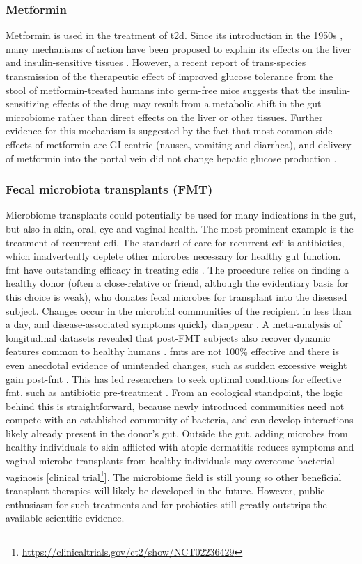 \subsubsection{Metformin}
Metformin is used in the treatment of \gls{t2d}. Since its introduction in the 1950s \cite{RN4103}, many mechanisms of action have been proposed to explain its effects on the liver and insulin-sensitive tissues \cite{RN4126}. However, a recent report of trans-species transmission of the therapeutic effect of improved glucose tolerance from the stool of metformin-treated humans into germ-free mice \cite{RN4127} suggests that the insulin-sensitizing effects of the drug may result from a metabolic shift in the gut microbiome rather than direct effects on the liver or other tissues. Further evidence for this mechanism is suggested by the fact that most common side-effects of metformin are GI-centric (nausea, vomiting and diarrhea), and delivery of metformin into the portal vein did not change hepatic glucose production \cite{RN4128}.

\subsubsection{Fecal microbiota transplants (FMT)}
Microbiome transplants could potentially be used for many indications in the gut, but also in skin, oral, eye and vaginal health. The most prominent example is the treatment of recurrent \gls{cdi}. The standard of care for recurrent \gls{cdi} is antibiotics, which inadvertently deplete other microbes necessary for healthy gut function. \Gls{fmt} have outstanding efficacy in treating \glspl{cdi} \cite{RN4129}. The procedure relies on finding a healthy donor (often a close-relative or friend, although the evidentiary basis for this choice is weak), who donates fecal microbes for transplant into the diseased subject. Changes occur in the microbial communities of the recipient in less than a day, and disease-associated symptoms quickly disappear \cite{RN4130}. A meta-analysis of longitudinal datasets revealed that post-FMT subjects also recover dynamic features common to healthy humans \cite{RN4131}. \Glspl{fmt} are not 100\% effective and there is even anecdotal evidence of unintended changes, such as sudden excessive weight gain post-\gls{fmt} \cite{RN4132}. This has led researchers to seek optimal conditions for effective \gls{fmt}, such as antibiotic pre-treatment \cite{RN4134, RN4133}. From an ecological standpoint, the logic behind this is straightforward, because newly introduced communities need not compete with an established community of bacteria, and can develop interactions likely already present in the donor's gut. Outside the gut, adding microbes from healthy individuals to skin afflicted with atopic dermatitis reduces symptoms \cite{RN4135} and vaginal microbe transplants from healthy individuals may overcome bacterial vaginosis [clinical trial\footnote{\url{https://clinicaltrials.gov/ct2/show/NCT02236429}}]. The microbiome field is still young so other beneficial transplant therapies will likely be developed in the future. However, public enthusiasm for such treatments and for probiotics still greatly outstrips the available scientific evidence.

